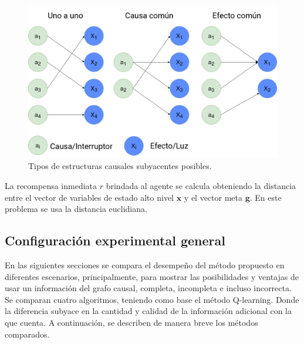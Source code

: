 \begin{figure}[H]
    \centering
    \includegraphics[scale=0.3]{Chapter5/Figs/switches_struct.png}
    \caption{Tipos de estructuras causales subyacentes posibles.}
    \label{fig:struct}
\end{figure}
La recompensa inmediata $r$ brindada al agente se calcula obteniendo la distancia entre el vector de variables de estado alto nivel $\mathbf{x}$ y el vector meta $\mathbf{g}$. En este problema se usa la distancia euclidiana.


\subsection{Configuración experimental general}

En las siguientes secciones se compara el desempeño 
del método propuesto en diferentes escenarios, principalmente, para mostrar 
las posibilidades y ventajas de usar un información del grafo causal, completa, incompleta e incluso incorrecta. 
Se comparan cuatro algoritmos, teniendo como base
el método Q-learning. Donde la diferencia subyace en la cantidad y calidad de la información adicional con la que cuenta. A continuación, se describen de manera breve los métodos
comparados.

